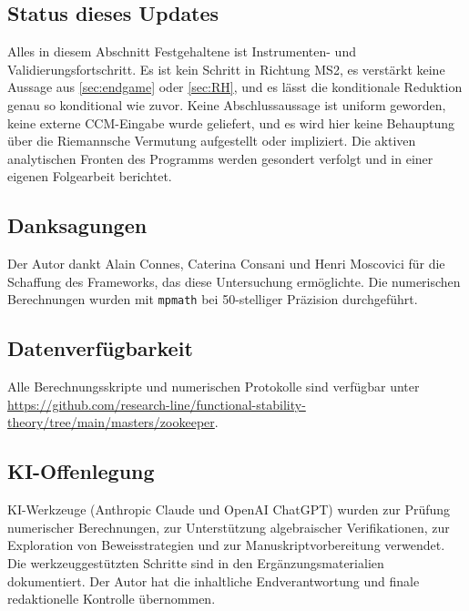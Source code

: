 \documentclass[12pt,a4paper]{article}
\theoremstyle{definition}
\theoremstyle{remark}
\begin{document}
\subsection{Status dieses Updates}

Alles in diesem Abschnitt Festgehaltene ist Instrumenten- und
Validierungsfortschritt.  Es ist kein Schritt in Richtung MS2, es
verstärkt keine Aussage aus \cref{sec:endgame} oder \cref{sec:RH}, und
es lässt die konditionale Reduktion genau so konditional wie zuvor.
Keine Abschlussaussage ist uniform geworden, keine externe CCM-Eingabe
wurde geliefert, und es wird hier keine Behauptung über die Riemannsche
Vermutung aufgestellt oder impliziert.  Die aktiven analytischen Fronten
des Programms werden gesondert verfolgt und in einer eigenen
Folgearbeit berichtet.

\bigskip

\subsection*{Danksagungen}

Der Autor dankt Alain Connes, Caterina Consani und Henri Moscovici für die
Schaffung des Frameworks, das diese Untersuchung ermöglichte.
Die numerischen Berechnungen wurden mit \texttt{mpmath}
\cite{mpmath} bei 50-stelliger Präzision durchgeführt.

\subsection*{Datenverfügbarkeit}

Alle Berechnungsskripte und numerischen Protokolle sind verfügbar unter
\url{https://github.com/research-line/functional-stability-theory/tree/main/masters/zookeeper}.

\subsection*{KI-Offenlegung}

KI-Werkzeuge (Anthropic Claude und OpenAI ChatGPT) wurden zur Prüfung
numerischer Berechnungen, zur Unterstützung algebraischer Verifikationen,
zur Exploration von Beweisstrategien und zur Manuskriptvorbereitung
verwendet. Die werkzeuggestützten Schritte sind in den Ergänzungsmaterialien
dokumentiert.
Der Autor hat die inhaltliche Endverantwortung und finale redaktionelle
Kontrolle übernommen.
\end{document}
